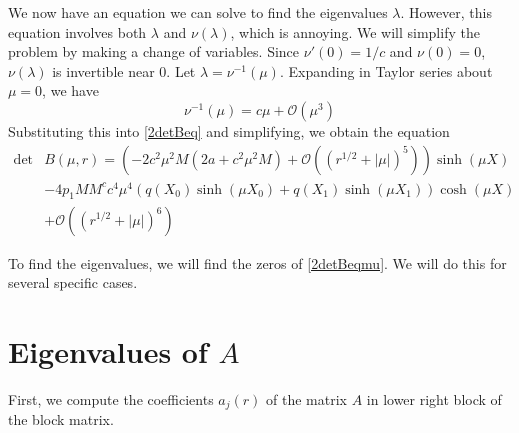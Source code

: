 \documentclass[thesis.tex]{subfiles}
\begin{document}
We now have an equation we can solve to find the eigenvalues $\lambda$. However, this equation involves both $\lambda$ and $\nu(\lambda)$, which is annoying. We will simplify the problem by making a change of variables. Since $\nu'(0) = 1/c$ and $\nu(0) = 0$, $\nu(\lambda)$ is invertible near 0. Let $\lambda = \nu^{-1}(\mu)$. Expanding in Taylor series about $\mu = 0$, we have
\[
\nu^{-1}(\mu) = c \mu + \mathcal{O}(\mu^3)
\]
Substituting this into \cref{2detBeq} and simplifying, we obtain the equation
\begin{equation}\label{2detBeqmu}
\begin{aligned}
\det &B(\mu, r) = \left(-2 c^2 \mu^2 M (2a + c^2 \mu^2 M) +  \mathcal{O}( (r^{1/2} + |\mu|)^5 )\right) \sinh(\mu X) \\
&-4 p_1 M M^c c^4 \mu^4 ( q(X_0) \sinh(\mu X_0) + q(X_1) \sinh(\mu X_1) ) \cosh(\mu X)  \\
&+ \mathcal{O}( (r^{1/2} + |\mu|)^6) 
\end{aligned}
\end{equation}

To find the eigenvalues, we will find the zeros of \cref{2detBeqmu}. We will do this for several specific cases.

\section{Eigenvalues of $A$}

First, we compute the coefficients $a_j(r)$ of the matrix $A$ in lower right block of the block matrix.
\end{document}
